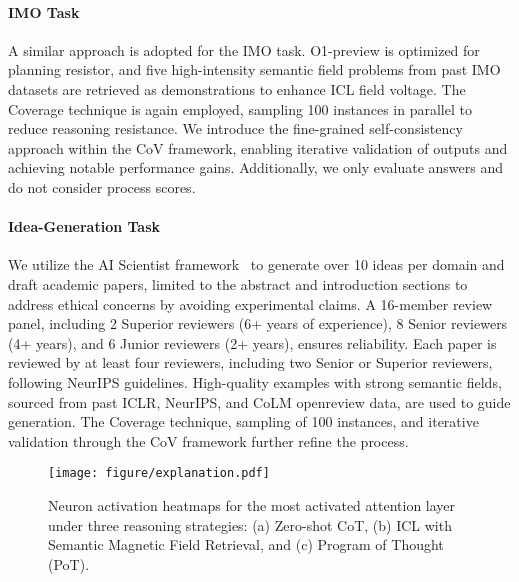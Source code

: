 \paragraph{IMO Task}
A similar approach is adopted for the IMO task. O1-preview is optimized for planning resistor, and five high-intensity semantic field problems from past IMO datasets are retrieved as demonstrations to enhance ICL field voltage. The Coverage technique is again employed, sampling 100 instances in parallel to reduce reasoning resistance. We introduce the fine-grained self-consistency approach within the CoV framework, enabling iterative validation of outputs and achieving notable performance gains. Additionally, we only evaluate answers and do not consider process scores.

\paragraph{Idea-Generation Task}
We utilize the AI Scientist framework~\citep{lu2024aiscientist} to generate over 10 ideas per domain and draft academic papers, limited to the abstract and introduction sections to address ethical concerns by avoiding experimental claims. A 16-member review panel, including 2 Superior reviewers (6+ years of experience), 8 Senior reviewers (4+ years), and 6 Junior reviewers (2+ years), ensures reliability. Each paper is reviewed by at least four reviewers, including two Senior or Superior reviewers, following NeurIPS guidelines. High-quality examples with strong semantic fields, sourced from past ICLR, NeurIPS, and CoLM openreview data, are used to guide generation. The Coverage technique, sampling of 100 instances, and iterative validation through the CoV framework further refine the process.


\begin{figure}[t]
    \centering
    \texttt{[image: figure/explanation.pdf]}
    \caption{Neuron activation heatmaps for the most activated attention layer under three reasoning strategies: (a) Zero-shot CoT, (b) ICL with Semantic Magnetic Field Retrieval, and (c) Program of Thought (PoT).}\label{fig:explanation}
\end{figure}
